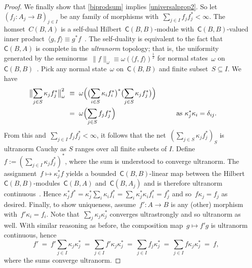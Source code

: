 \documentclass[reqno,T1]{amsproc}
\newcommand{\cat}[1]{\mathsf{#1}}		%
\theoremstyle{plain}
\theoremstyle{remark}
\numberwithin{equation}{section}
\begin{document}
\begin{proof}
We finally show that \ref{biprodsum} implies \ref{universalprop2}. So let~$\left(f_j: A_j \to B\right)_{j\in I}$ be any family of morphisms
        with~$\sum_{j \in I}f_jf_j^* < \infty$.
The homset~$C(B,A)$
    is a self-dual Hilbert~$\cat{C}(B,B)$-module
    with~$\cat{C}(B,B)$-valued inner
    product~$\langle g, f\rangle \equiv g^*f$~\cite[2.15]{wstarcat}.
The self-duality is equivalent to the fact
    that~$\cat{C}(B,A)$ is complete in the \emph{ultranorm} topology;
    that is, the uniformity
    generated by the seminorms~$\| f \|_\omega \equiv \omega(\langle f,f\rangle)^\frac{1}{2}$
    for normal states~$\omega$ on~$\cat{C}(B,B)$~\cite[\S149\textsubscript{V}]{bas}.
    Pick any normal state~$\omega$ on~$\cat{C}(B,B)$
        and finite subset~$S \subseteq I$.  We have
\begin{alignat*}{2}
    \bigl\| \sum_{j \in S} \kappa_j f_j^* \bigr\|^2_\omega
    &\ \equiv \ 
    \omega\Bigl(\bigl(\sum_{i \in S} \kappa_i f_i^*\bigr)^*
            \bigl(\sum_{j \in S} \kappa_j f_j^*\bigr)\Bigr) \\
    &\ =\ 
    \omega\Bigl( \sum_{j \in S} f_j f_j^*
    \Bigr) &\qquad&\text{as~$\kappa_j^*\kappa_i = \delta_{ij}$}.
\end{alignat*}
From this and~$\sum_{j \in I} f_jf_j^* < \infty$,
    it follows that the net~$\left(\sum_{j \in S} \kappa_j f_j^*\right)_S$
    is ultranorm Cauchy as $S$ ranges over all finite subsets of $I$.
    Define~$f := \left( \sum_{j \in I} \kappa_jf_j^* \right)^*$,
        where the sum is understood to converge ultranorm.
The assignment~$f \mapsto \kappa_j^*f$
    yields a bounded~$\cat{C}(B,B)$-linear map between
    the Hilbert~$\cat{C}(B,B)$-modules~$\cat{C}(B,A)$ and~$\cat{C}(B,A_j)$
    and is therefore ultranorm continuous~\cite[\S148]{bas}.
    Hence
        $\kappa_j^* f^*
             =  \kappa_j^* \sum_{i} \kappa_i f_i^*
             =  \sum_i \kappa_{j }^*\kappa_i f_i^*
            =  f_j^*$
            and so~$f \kappa_j = f_j$ as desired.
Finally, to show uniqueness,
    assume~$f'\colon A \to B$ is any (other)
    morphism with~$f' \kappa_i = f_i$.
    Note that~$\sum_j \kappa_j \kappa_j^*$
       converges ultrastrongly
       and so ultranorm as well.
With similar reasoning as before,
        the composition map~$g \mapsto f' g$ is ultranorm continuous,
        hence
\begin{equation*}
    f'
    \ =\ f' \sum_{j \in I} \kappa_j \kappa_j^*
    \ =\ \sum_{j \in I} f' \kappa_j \kappa_j^*
    \ =\ \sum_{j \in I} f_j \kappa_j^*
    \ =\ \sum_{j \in I} f \kappa_j \kappa_j^*
    \ =\ f,
\end{equation*}
    where the sums converge ultranorm.
\end{proof}
\end{document}

